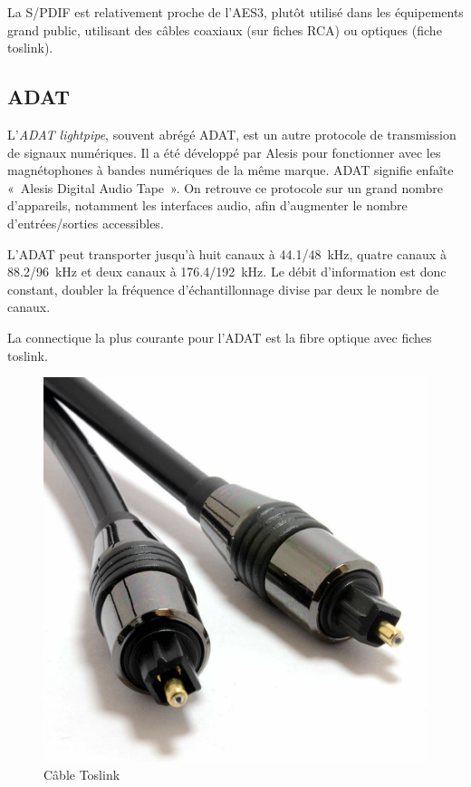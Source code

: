 \documentclass[
]{book}
\begin{document}
La S/PDIF est relativement proche de l'AES3, plutôt utilisé dans les équipements grand public, utilisant des câbles coaxiaux (sur fiches RCA) ou optiques (fiche toslink).

\hypertarget{adat}{%
\subsection{ADAT}\label{adat}}

L'\emph{ADAT lightpipe}, souvent abrégé ADAT, est un autre protocole de transmission de signaux numériques. Il a été développé par Alesis pour fonctionner avec les magnétophones à bandes numériques de la même marque. ADAT signifie enfaîte «~Alesis Digital Audio Tape~». On retrouve ce protocole sur un grand nombre d'appareils, notamment les interfaces audio, afin d'augmenter le nombre d'entrées/sorties accessibles.

L'ADAT peut transporter jusqu'à huit canaux à 44.1/48~kHz, quatre canaux à 88.2/96~kHz et deux canaux à 176.4/192~kHz. Le débit d'information est donc constant, doubler la fréquence d'échantillonnage divise par deux le nombre de canaux.

La connectique la plus courante pour l'ADAT est la fibre optique avec fiches toslink.

\begin{figure}

{\centering \includegraphics{_resources/bitmap/plug/toslink} 

}

\caption{Câble Toslink}\label{fig:unnamed-chunk-32}
\end{figure}
\end{document}
